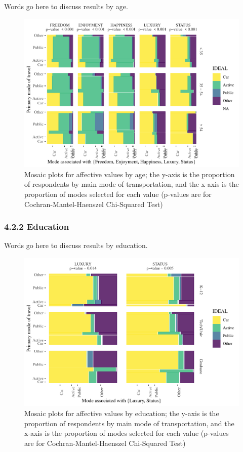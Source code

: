 \documentclass[]{elsarticle} %
\makeatletter
\def\maxwidth{\ifdim\Gin@nat@width>\linewidth\linewidth
\else\Gin@nat@width\fi}
\let\Oldincludegraphics\includegraphics
\renewcommand{\includegraphics}[1]{\Oldincludegraphics[width=\maxwidth]{#1}}
\makeatother
\begin{document}
Words go here to discuss results by age.

\begin{figure}
\centering
\includegraphics{Dissonance_Santiago_v1_files/figure-latex/figure-mosaic-plots-by-attribute-and-age-1.pdf}
\caption{\label{fig:mosaic-plots-by-age}Mosaic plots for affective
values by age; the y-axis is the proportion of respondents by main mode
of transportation, and the x-axis is the proportion of modes selected
for each value (p-values are for Cochran-Mantel-Haenszel Chi-Squared
Test)}
\end{figure}

\hypertarget{education-1}{%
\subsubsection{4.2.2 Education}\label{education-1}}

Words go here to discuss results by education.

\begin{figure}
\centering
\includegraphics{Dissonance_Santiago_v1_files/figure-latex/figure-mosaic-plots-by-attribute-and-education-1.pdf}
\caption{\label{fig:mosaic-plots-by-education}Mosaic plots for affective
values by education; the y-axis is the proportion of respondents by main
mode of transportation, and the x-axis is the proportion of modes
selected for each value (p-values are for Cochran-Mantel-Haenszel
Chi-Squared Test)}
\end{figure}
\end{document}

